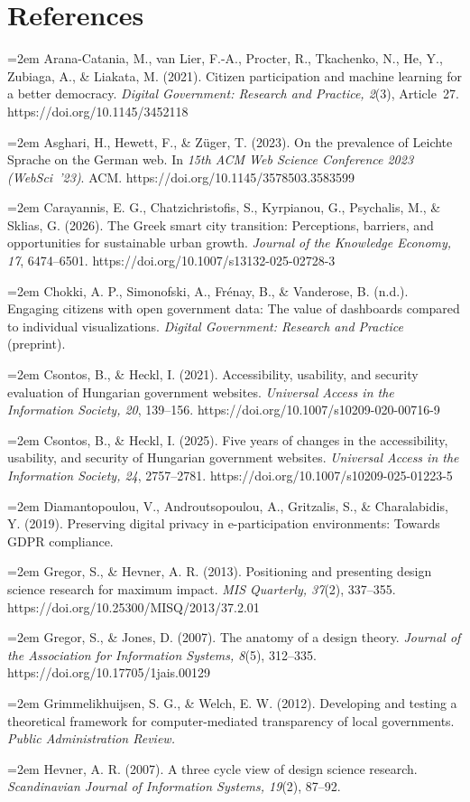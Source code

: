 \documentclass[11pt,a4paper]{article}
\newcommand{\refitem}[1]{\noindent\hangindent=2em\hangafter=1 #1\par\smallskip}
\begin{document}
\section*{References}
\refitem{Arana-Catania, M., van Lier, F.-A., Procter, R., Tkachenko, N., He, Y., Zubiaga, A., \& Liakata, M. (2021). Citizen participation and machine learning for a better democracy. \emph{Digital Government: Research and Practice, 2}(3), Article~27. https://doi.org/10.1145/3452118}
\refitem{Asghari, H., Hewett, F., \& Z\"uger, T. (2023). On the prevalence of Leichte Sprache on the German web. In \emph{15th ACM Web Science Conference 2023 (WebSci~'23)}. ACM. https://doi.org/10.1145/3578503.3583599}
\refitem{Carayannis, E. G., Chatzichristofis, S., Kyrpianou, G., Psychalis, M., \& Sklias, G. (2026). The Greek smart city transition: Perceptions, barriers, and opportunities for sustainable urban growth. \emph{Journal of the Knowledge Economy, 17}, 6474--6501. https://doi.org/10.1007/s13132-025-02728-3}
\refitem{Chokki, A. P., Simonofski, A., Fr\'enay, B., \& Vanderose, B. (n.d.). Engaging citizens with open government data: The value of dashboards compared to individual visualizations. \emph{Digital Government: Research and Practice} (preprint).}
\refitem{Csontos, B., \& Heckl, I. (2021). Accessibility, usability, and security evaluation of Hungarian government websites. \emph{Universal Access in the Information Society, 20}, 139--156. https://doi.org/10.1007/s10209-020-00716-9}
\refitem{Csontos, B., \& Heckl, I. (2025). Five years of changes in the accessibility, usability, and security of Hungarian government websites. \emph{Universal Access in the Information Society, 24}, 2757--2781. https://doi.org/10.1007/s10209-025-01223-5}
\refitem{Diamantopoulou, V., Androutsopoulou, A., Gritzalis, S., \& Charalabidis, Y. (2019). Preserving digital privacy in e-participation environments: Towards GDPR compliance.}
\refitem{Gregor, S., \& Hevner, A. R. (2013). Positioning and presenting design science research for maximum impact. \emph{MIS Quarterly, 37}(2), 337--355. https://doi.org/10.25300/MISQ/2013/37.2.01}
\refitem{Gregor, S., \& Jones, D. (2007). The anatomy of a design theory. \emph{Journal of the Association for Information Systems, 8}(5), 312--335. https://doi.org/10.17705/1jais.00129}
\refitem{Grimmelikhuijsen, S. G., \& Welch, E. W. (2012). Developing and testing a theoretical framework for computer-mediated transparency of local governments. \emph{Public Administration Review.}}
\refitem{Hevner, A. R. (2007). A three cycle view of design science research. \emph{Scandinavian Journal of Information Systems, 19}(2), 87--92.}
\end{document}
